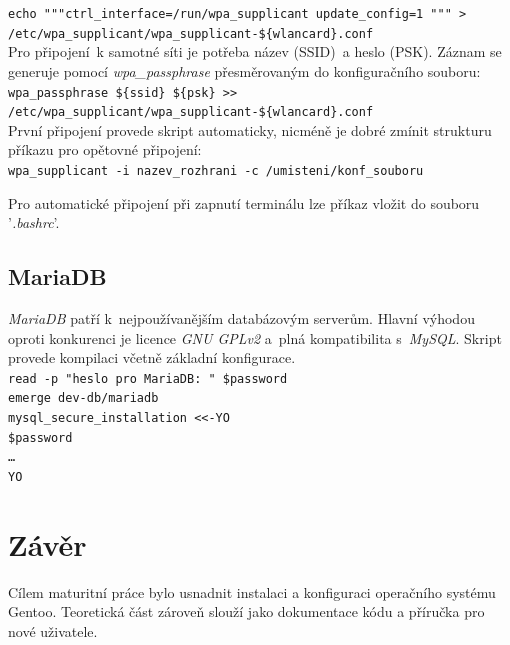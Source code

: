\documentclass[12pt,a4paper,twoside,]{article}
\begin{document}
{{{{{{\texttt{echo """ctrl\_interface=/run/wpa\_supplicant
	update\_config=1 """ > \hspace*{1.5em}/etc/wpa\_supplicant/wpa\_supplicant-\$\{wlancard\}.conf}\\

\hspace{-1.5em}Pro připojení~k samotné síti je potřeba název (SSID)~a heslo (PSK). Záznam se generuje pomocí \textit{wpa\_passphrase} přesměrovaným do konfiguračního souboru: \\

\texttt{wpa\_passphrase \$\{ssid\} \$\{psk\} >> \\\hspace*{1.5em}/etc/wpa\_supplicant/wpa\_supplicant-\$\{wlancard\}.conf}\\

\hspace{-1.5em}První připojení provede skript automaticky, nicméně je dobré zmínit strukturu příkazu pro opětovné připojení:\\

\texttt{wpa\_supplicant -i nazev\_rozhrani -c /umisteni/konf\_souboru}

\hspace*{-1.5em}Pro automatické připojení při zapnutí terminálu lze příkaz vložit do souboru '\textit{.bashrc}'.
\subsection{\textsf{MariaDB}}
\textit{MariaDB} patří k~nejpoužívanějším databázovým serverům. Hlavní výhodou oproti konkurenci je licence \textit{GNU GPLv2} a~plná kompatibilita s~\textit{MySQL}. Skript provede kompilaci včetně základní konfigurace.\\

\texttt{read -p "heslo pro MariaDB: " \$password}\\
\hspace*{1.5em}\texttt{emerge dev-db/mariadb}\\
\hspace*{1.5em}\texttt{mysql\_secure\_installation <<-YO}\\
\hspace*{3em}\texttt{\$password}\\
\hspace*{3em}\texttt{\dots}\\
\hspace*{1.5em}\texttt{YO}

\newpage
\section{\textsf{Závěr}}
Cílem maturitní práce bylo usnadnit instalaci a konfiguraci operačního systému Gentoo. Teoretická část zároveň slouží jako dokumentace kódu a příručka pro nové uživatele. 

}}}}}}
\end{document}

